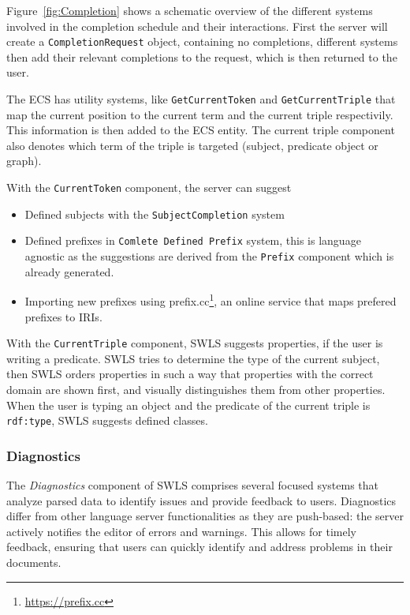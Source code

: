Figure~\ref{fig:Completion} shows a schematic overview of the different systems involved in the completion schedule and their interactions.
First the server will create a \texttt{CompletionRequest} object, containing no completions,
different systems then add their relevant completions to the request, which is then returned to the user.

The ECS has utility systems, like \texttt{GetCurrentToken} and \texttt{GetCurrentTriple} that map the current position to the current term and the current triple respectivily. This information is then added to the ECS entity. The current triple component also denotes which term of the triple is targeted (subject, predicate object or graph).

With the \texttt{CurrentToken} component, the server can suggest
\begin{itemize}
  \item Defined subjects with the \texttt{SubjectCompletion} system
  \item Defined prefixes in \texttt{Comlete Defined Prefix} system, this is language agnostic as the suggestions are derived from the \texttt{Prefix} component which is already generated.
  \item Importing new prefixes using prefix.cc\footnote{\url{https://prefix.cc}}, an online service that maps prefered prefixes to IRIs.
\end{itemize}

With the \texttt{CurrentTriple} component, SWLS suggests properties, if the user is writing a predicate.
SWLS tries to determine the type of the current subject, then SWLS orders properties in such a way that properties with the correct domain are shown first,
and visually distinguishes them from other properties.
When the user is typing an object and the predicate of the current triple is \texttt{rdf:type}, SWLS suggests defined classes.


\subsubsection{Diagnostics}

The \textit{Diagnostics} component of SWLS comprises several focused systems that analyze parsed data to identify issues and provide feedback to users.
Diagnostics differ from other language server functionalities as they are push-based: the server actively notifies the editor of errors and warnings.
This allows for timely feedback, ensuring that users can quickly identify and address problems in their documents.

